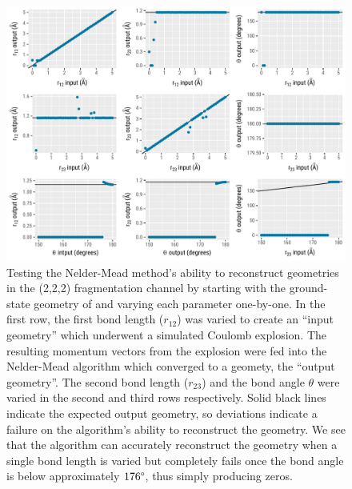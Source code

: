 \begin{figure}
  \centering
  \includegraphics[width=\textwidth]{Plots/CO2SimplexCalibrationPlots}
  \caption[Testing the Nelder-Mead method's ability to reconstruct  (2,2,2) geometries]
  {Testing the Nelder-Mead method's ability to reconstruct  geometries in the (2,2,2) fragmentation channel by starting with the ground-state geometry of  and varying each parameter one-by-one. In the first row, the first  bond length ($r_{12}$) was varied to create an ``input geometry'' which underwent a simulated Coulomb explosion. The resulting momentum vectors from the explosion were fed into the Nelder-Mead algorithm which converged to a geomety, the ``output geometry''. The second  bond length ($r_{23}$) and the bond angle $\theta$ were varied in the second and third rows respectively. Solid black lines indicate the expected output geometry, so deviations indicate a failure on the algorithm's ability to reconstruct the geometry. We see that the algorithm can accurately reconstruct the geometry when a single bond length is varied but completely fails once the bond angle is below approximately $176\degree$, thus simply producing zeros.}
  \label{fig:CO2SimplexCalibrationPlots}
\end{figure}

